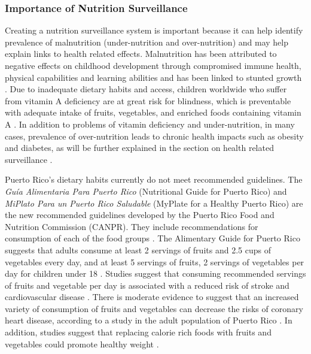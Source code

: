 \documentclass[12pt,letterpaper]{report}
\begin{document}
\subsubsection{Importance of Nutrition Surveillance}
Creating a nutrition surveillance system is important because it can help identify prevalence of malnutrition (under-nutrition and over-nutrition) and may help explain links to health related effects. Malnutrition has been attributed to negative effects on childhood development through compromised immune health, physical capabilities and learning abilities and has been linked to stunted growth \cite{brown1996malnutrition, martorell1999nature}. Due to inadequate dietary habits and access, children worldwide who suffer from vitamin A deficiency are at great risk for blindness, which is preventable with adequate intake of fruits, vegetables, and enriched foods containing vitamin A \cite{sommer1996vitamin}. In addition to problems of vitamin deficiency and under-nutrition, in many cases, prevalence of over-nutrition leads to chronic health impacts such as obesity and diabetes, as will be further explained in the section on health related surveillance \cite{hawkes2006uneven, wang2006worldwide, wing2001behavioral}.

Puerto Rico's dietary habits currently do not meet recommended guidelines. The \textit{Gu\'{i}a Alimentaria Para Puerto Rico} (Nutritional Guide for Puerto Rico) and \textit{MiPlato Para un Puerto Rico Saludable} (MyPlate for a Healthy Puerto Rico) are the new recommended guidelines developed by the Puerto Rico Food and Nutrition Commission (CANPR). They include recommendations for consumption of each of the food groups \cite{GuiaAlimentariaPR}. The Alimentary Guide for Puerto Rico suggests that adults consume at least 2 servings of fruits and 2.5 cups of vegetables every day, and at least 5 servings of fruits, 2 servings of vegetables per day for children under 18 \cite{GuiaAlimentariaPR}. Studies suggest that consuming recommended servings of fruits and vegetable per day is associated with a reduced risk of stroke and cardiovascular disease \cite{bazzano2002fruit, he2006fruit}. There is moderate evidence to suggest that an increased variety of consumption of fruits and vegetables can decrease the risks of coronary heart disease, according to a study in the adult population of Puerto Rico \cite{bhupathiraju2011greater}. In addition, studies suggest that replacing calorie rich foods with fruits and vegetables could promote healthy weight \cite{rolls2004can}. 
\end{document}
